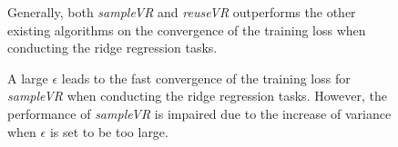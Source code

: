 \documentclass[letterpaper]{article}
\begin{document}
\begin{figure}[t]
\caption{Generally, both \emph{sampleVR} and \emph{reuseVR} outperforms the other existing algorithms on the convergence of the training loss when conducting the ridge regression tasks.}
\label{figure_ridge_regression_convergence}
\end{figure}



\begin{figure}[t]
\centering
{}
\caption{A large $\epsilon$ leads to the fast convergence of the training loss for \emph{sampleVR} when conducting the ridge regression tasks. However, the performance of  \emph{sampleVR} is impaired  due to the increase of variance when $\epsilon$ is set to be too large.}
\label{figure_ridge_regression_rho}
\end{figure}
\end{document}

